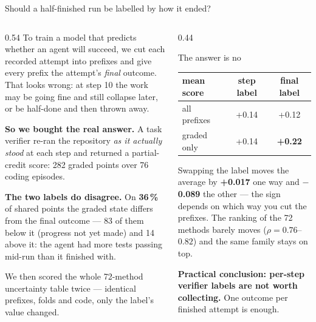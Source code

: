 \documentclass[11pt, aspectratio=169]{beamer}
\newcommand{\g}[1]{\textcolor{accent2}{\textbf{#1}}}
\newcommand{\bad}[1]{\textcolor{warn}{\textbf{#1}}}
\begin{document}
\begin{frame}{Should a half-finished run be labelled by how it ended?}
\scriptsize
\begin{columns}[t]
\begin{column}{0.54\textwidth}
To train a model that predicts whether an agent will succeed, we cut each
recorded attempt into prefixes and give every prefix the attempt's \emph{final}
outcome. That looks wrong: at step 10 the work may be going fine and still
collapse later, or be half-done and then thrown away.

\medskip
\textbf{So we bought the real answer.} A task verifier re-ran the repository
\emph{as it actually stood} at each step and returned a partial-credit score:
282 graded points over 76 coding episodes.

\medskip
\textbf{The two labels do disagree.} On \g{36\,\%} of shared points the graded
state differs from the final outcome --- 83 of them below it (progress not yet
made) and 14 above it: the agent had more tests passing mid-run than it
finished with.

\medskip
We then scored the whole 72-method uncertainty table twice --- identical
prefixes, folds and code, only the label's value changed.
\end{column}
\begin{column}{0.44\textwidth}
\begin{block}{The answer is no}
\begin{center}\scriptsize
\begin{tabular}{lcc}
\toprule
mean score & step label & final label \\
\midrule
all prefixes    & +0.14 & +0.12 \\
graded only     & +0.14 & \g{+0.22} \\
\bottomrule
\end{tabular}
\end{center}
\smallskip
Swapping the label moves the average by \textbf{+0.017} one way and
\bad{$-$0.089} the other --- the sign depends on which way you cut the
prefixes. The ranking of the 72 methods barely moves ($\rho=0.76$--$0.82$) and
the same family stays on top.

\medskip
\textbf{Practical conclusion: per-step verifier labels are not worth
collecting.} One outcome per finished attempt is enough.
\end{block}
\end{column}
\end{columns}
\end{frame}
\end{document}
